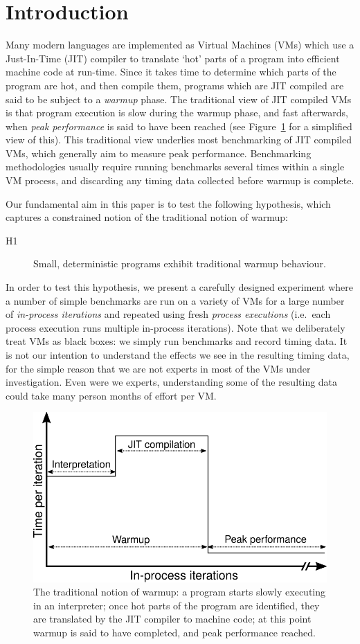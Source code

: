 \documentclass[a4paper,UKenglish]{lipics}
\newcommand{\hypone}{H1\xspace}
\begin{document}
\section{Introduction}
\label{sec:intro}

Many modern languages are implemented as Virtual Machines (VMs) which use a
Just-In-Time (JIT) compiler to translate `hot' parts of a program into efficient
machine code at run-time. Since it takes time to determine which parts of the
program are hot, and then compile them, programs which are JIT compiled are
said to be subject to a \emph{warmup} phase. The traditional view of
JIT compiled VMs is that program execution is slow during the warmup phase, and
fast afterwards, when \emph{peak performance} is said to have been reached
(see Figure~\ref{fig:trad} for a simplified view of this).
This traditional view underlies most benchmarking of JIT compiled VMs, which
generally aim to measure peak performance.
Benchmarking methodologies usually
require running benchmarks several times within a single VM process, and
discarding any timing data collected before warmup is complete.

Our fundamental aim in this paper is to test the following hypothesis, which captures a constrained
notion of the traditional notion of warmup:
\begin{description}
  \item[\hypone] Small, deterministic programs exhibit traditional warmup behaviour.
\end{description}
In order to test this hypothesis, we present a carefully designed
experiment where a number of simple benchmarks are run on a variety of
VMs for a large number of \emph{in-process iterations} and repeated using fresh
\emph{process executions} (i.e.~each process execution runs multiple in-process
iterations). Note that we deliberately treat VMs as black
boxes: we simply run benchmarks and record timing data. It is not our intention
to understand the effects we see in the resulting timing data, for the simple
reason that we are not experts in most of the VMs under investigation. Even were
we experts, understanding some of the resulting data could take many person
months of effort per VM.

\begin{figure}[t]
\centering
\includegraphics[width=.5\textwidth]{img/picturebook_warmup}
\caption{The traditional notion of warmup: a program starts slowly executing in
an interpreter; once hot parts of the program are identified, they are
translated by the JIT compiler to machine code; at this point warmup
is said to have completed, and peak performance reached.}
\label{fig:trad}
\end{figure}
\end{document}
